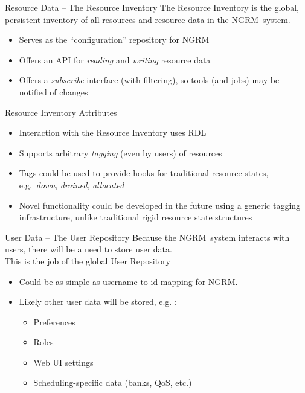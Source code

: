 \documentclass[default,pdf,colorBG,slideColor]{prosper}
\newcommand{\ngrm}{NGRM}
\begin{document}
\begin{slide}{Resource Data -- The Resource Inventory}
{\centering
The Resource Inventory is the global, persistent inventory of all resources
and resource data in the \ngrm\ system.}
\begin{itemize}
 \item{Serves as the ``configuration'' repository for \ngrm}
 \item{Offers an API for \emph{reading} and \emph{writing} resource data}
 \item{Offers a \emph{subscribe} interface (with filtering), so tools (and jobs) 
       may be notified of changes}
\end{itemize}
\end{slide}

\begin{slide}{Resource Inventory Attributes}
\begin{itemize}
 \item{Interaction with the Resource Inventory uses RDL}
 \item{Supports arbitrary \emph{tagging} (even by users) of resources}
 \item{Tags could be used to provide hooks for traditional resource
       states, e.g.\ \emph{down}, \emph{drained}, \emph{allocated}}
 \item{Novel functionality could be developed in the future using
        a generic tagging infrastructure, unlike traditional rigid
	resource state structures}
\end{itemize}
\end{slide}

\begin{slide}{User Data -- The User Repository}
{\centering
Because the \ngrm\ system interacts with users, there will be a need to
store user data.\\
\centering This is the job of the global User Repository}
\begin{itemize}
 \item {Could be as simple as username to id mapping for \ngrm.}
 \item {Likely other user data will be stored, e.g. :}
 \begin{itemize}
  \item Preferences
  \item Roles
  \item Web UI settings
  \item {Scheduling-specific data (banks, QoS, etc.)}
 \end{itemize}
\end{itemize}
\end{slide}
\end{document}
